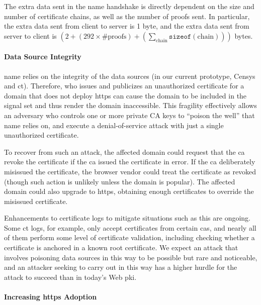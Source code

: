 The extra data sent in the \ac{name} handshake is directly dependent on the size
and number of certificate chains, as well as the number of proofs sent. In
particular, the extra data sent from client to server is 1 byte, and the extra
data sent from server to client is
$(2 + (292 \times \text{\#proofs}) +
(\sum_{\text{chain}}\texttt{sizeof}(\text{chain})))$ bytes. 

\paragraph{Data Source Integrity}

\ac{name} relies on the integrity of the data sources (in our current prototype,
Censys and \ac{ct}). Therefore,  who issues
and publicizes an unauthorized certificate for a domain that does not deploy
\ac{https} can cause the domain to be included in the signal set and thus render
the domain inaccessible. This fragility effectively allows an adversary who controls
one or more private CA keys to
``poison the well'' that \ac{name} relies on, and execute a denial-of-service
attack with just a single unauthorized certificate.

To recover from such an attack, the
affected domain could request that the \ac{ca} revoke the certificate if the
\ac{ca} issued the certificate in error. If the \ac{ca} deliberately misissued
the certificate, the browser vendor could treat the certificate as revoked
(though such action is unlikely unless the domain is popular). The affected
domain could also upgrade to \ac{https}, obtaining enough certificates to
override the misissued certificate. 

Enhancements to certificate logs to mitigate situations such as this are ongoing. Some
\ac{ct} logs, for example, only accept certificates from certain \acp{ca}, and
nearly all of them perform some level of certificate validation, including
checking whether a certificate is anchored in a known root certificate. We
expect an attack that involves poisoning data sources in this way to be possible
but rare and noticeable, and an attacker seeking to carry out  in this way has a
higher hurdle for the attack to succeed than in today's Web \ac{pki}.

\paragraph{Increasing \ac{https} Adoption}

